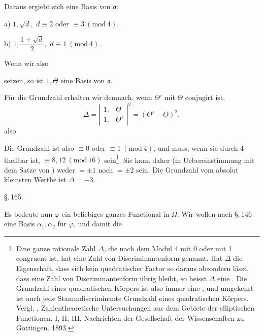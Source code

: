Daraus ergiebt sich eine Basis von $\mathfrak{o}$:

a) \quad $1, \sqrt{d},$ \hfill $d\equiv 2$ oder $\equiv 3\ (\mathrm{mod}\ 4),$

b) \quad $1, \dfrac{1+\sqrt{d}}{2},$ \hfill $d\equiv 1\ (\mathrm{mod}\ 4).$

Wenn wir also

setzen, so ist $1, \Theta$ eine Basis von $\mathfrak{o}$.

F\"ur die Grundzahl erhalten wir demnach, wenn $\Theta'$ mit $\Theta$ conjugirt ist,
\[ \Delta = \left|\begin{array}{cc} 1, & \Theta \\ 1, & \Theta' \end{array}\right|^2 = (\Theta'-\Theta)^2, \]
also


Die Grundzahl ist also $\equiv 0$ oder $\equiv 1\ (\mathrm{mod}\ 4)$, und muss, wenn sie durch 4 theilbar ist, $\equiv 8, 12\ (\mathrm{mod}\ 16)$ sein\footnote{Eine ganze rationale Zahl $\Delta$, die nach dem Modul 4 mit 0 oder mit 1 congruent ist, hat  eine Zahl von Discriminantenform genannt. Hat $\Delta$ die Eigenschaft, dass sich kein quadratischer Factor so daraus absondern l\"asst, dass eine Zahl von Discriminantenform \"ubrig bleibt, so heisst $\Delta$ eine . Die Grundzahl eines quadratischen K\"orpers ist also immer eine , und umgekehrt ist auch jede Stammdiscriminante Grundzahl eines quadratischen K\"orpers. Vergl. , Zahlentheoretische Untersuchungen aus dem Gebiete der elliptischen Functionen. I, II, III. Nachrichten der Gesellschaft der Wissenschaften zu G\"ottingen. 1893.}. Sie kann daher (in Uebereinstimmung mit dem Satze von ) weder $=\pm 1$ noch $=\pm 2$ sein. Die Grundzahl vom absolut kleinsten Werthe ist $\Delta = -3.$

\begin{center}
\S.\,165.\\
\end{center}

Es bedeute nun $\varphi$ ein beliebiges ganzes Functional in $\Omega$. Wir wollen nach \S.\,146 eine Basis $\alpha_1, \alpha_2$ f\"ur $\varphi$, und damit die
